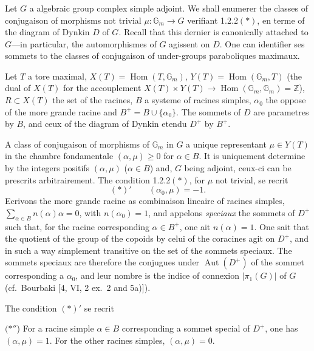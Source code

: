 \documentclass[12pt,a4paper]{article}
\theoremstyle{plain}
\theoremstyle{definition}
\theoremstyle{remark}
\DeclareMathOperator{\Hom}{Hom}
\DeclareMathOperator{\Aut}{Aut}
\newcommand{\ZZ}{\mathbb{Z}}
\newcommand{\Gm}{\mathbb{G}}
\begin{document}
\subsubsection{}

Let $G$ a algebraic group complex simple adjoint. We shall enumerer the classes of conjugaison of morphisms not trivial $\mu:\Gm_m \to G$ verifiant 1.2.2$(*)$, en terme of the diagram of Dynkin $D$ of $G$. Recall that this dernier is canonically attached to $G$---in particular, the automorphismes of $G$ agissent on $D$. One can identifier ses sommets to the classes of conjugaison of under-groups paraboliques maximaux.

Let $T$ a tore maximal, $X(T) = \Hom(T,\Gm_m)$, $Y(T) = \Hom(\Gm_m,T)$ (the dual of $X(T)$ for the accouplement $X(T) \times Y(T) \to \Hom(\Gm_m,\Gm_m) = \ZZ$), $R \subset X(T)$ the set of the racines, $B$ a systeme of racines simples, $\alpha_0$ the oppose of the more grande racine and $B^+ = B \cup \{\alpha_0\}$. The sommets of $D$ are parametres by $B$, and ceux of the diagram of Dynkin etendu $D^+$ by $B^+$.

A class of conjugaison of morphisms of $\Gm_m$ in $G$ a unique representant $\mu \in Y(T)$ in the chambre fondamentale $(\alpha,\mu) \ge 0$ for $\alpha \in B$. It is uniquement determine by the integers positifs $(\alpha,\mu)$ ($\alpha \in B$) and, $G$ being adjoint, ceux-ci can be prescrits arbitrairement. The condition 1.2.2$(*)$, for $\mu$ not trivial, se recrit
\[
(*)' \qquad (\alpha_0,\mu) = -1.
\]
Ecrivons the more grande racine as combinaison lineaire of racines simples, $\sum_{\alpha \in B} n(\alpha)\alpha = 0$, with $n(\alpha_0) = 1$, and appelons \textit{speciaux} the sommets of $D^+$ such that, for the racine corresponding $\alpha \in B^+$, one ait $n(\alpha) = 1$. One sait that the quotient of the group of the copoids by celui of the coracines agit on $D^+$, and in such a way simplement transitive on the set of the sommets speciaux. The sommets speciaux are therefore the conjugues under $\Aut(D^+)$ of the sommet corresponding a $\alpha_0$, and leur nombre is the indice of connexion $|\pi_1(G)|$ of $G$ (cf.~Bourbaki [4, VI, 2 ex.~2 and 5a)]).

The condition $(*)'$ se recrit

$(*''$) For a racine simple $\alpha \in B$ corresponding a sommet special of $D^+$, one has $(\alpha,\mu) = 1$. For the other racines simples, $(\alpha,\mu) = 0$.

\subsubsection{}
\end{document}
